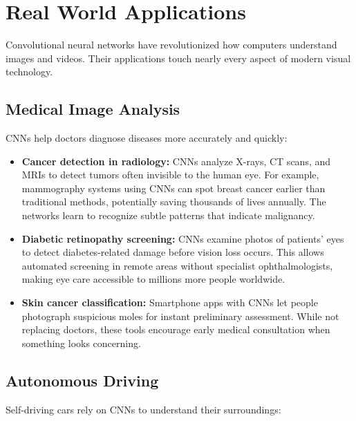 
\section{Real World Applications}
\label{sec:cnn-real-world}

Convolutional neural networks have revolutionized how computers understand images and videos. Their applications touch nearly every aspect of modern visual technology.

\subsection{Medical Image Analysis}

CNNs help doctors diagnose diseases more accurately and quickly:

\begin{itemize}
    \item \textbf{Cancer detection in radiology:} CNNs analyze X-rays, CT scans, and MRIs to detect tumors often invisible to the human eye. For example, mammography systems using CNNs can spot breast cancer earlier than traditional methods, potentially saving thousands of lives annually. The networks learn to recognize subtle patterns that indicate malignancy.
    
    \item \textbf{Diabetic retinopathy screening:} CNNs examine photos of patients' eyes to detect diabetes-related damage before vision loss occurs. This allows automated screening in remote areas without specialist ophthalmologists, making eye care accessible to millions more people worldwide.
    
    \item \textbf{Skin cancer classification:} Smartphone apps with CNNs let people photograph suspicious moles for instant preliminary assessment. While not replacing doctors, these tools encourage early medical consultation when something looks concerning.
\end{itemize}

\subsection{Autonomous Driving}

Self-driving cars rely on CNNs to understand their surroundings:

